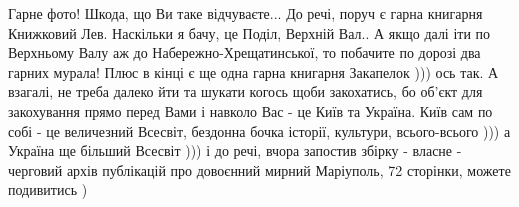 Гарне фото! Шкода, що Ви таке відчуваєте... До речі, поруч є гарна книгарня
Книжковий Лев. Наскільки я бачу, це Поділ, Верхній Вал.. А якщо далі іти по
Верхньому Валу аж до Набережно-Хрещатинської, то побачите по дорозі два гарних
мурала! Плюс в кінці є ще одна гарна книгарня Закапелок ))) ось так. А взагалі,
не треба далеко йти та шукати когось щоби закохатись, бо об'єкт для закохування
прямо перед Вами і навколо Вас - це Київ та Україна. Київ сам по собі - це
величезний Всесвіт, бездонна бочка історії, культури, всього-всього ))) а
Україна ще більший Всесвіт ))) і до речі, вчора запостив збірку - власне -
черговий архів публікацій про довоєнний мирний Маріуполь, 72 сторінки, можете
подивитись )
